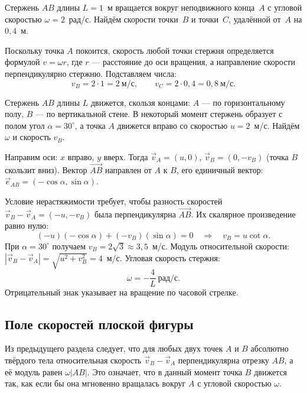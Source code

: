 \documentclass[../main.tex]{subfiles}
\begin{document}
\begin{example}
Стержень $AB$ длины $L = 1$~м вращается вокруг неподвижного конца~$A$
с угловой скоростью $\omega = 2$~рад/с. Найдём скорости точки~$B$
и точки~$C$, удалённой от~$A$ на $0{,}4$~м.

Поскольку точка $A$ покоится, скорость любой точки стержня определяется
формулой $v = \omega r$, где $r$ --- расстояние до оси вращения,
а направление скорости перпендикулярно стержню. Подставляем числа:
\[
v_B = 2 \cdot 1 = 2~\text{м/с}, \qquad
v_C = 2 \cdot 0{,}4 = 0{,}8~\text{м/с}.
\]
\end{example}

\begin{example}
Стержень $AB$ длины $L$ движется, скользя концами: $A$ --- по горизонтальному
полу, $B$ --- по вертикальной стене. В некоторый момент стержень образует
с полом угол $\alpha = 30^\circ$, а точка $A$ движется вправо со скоростью
$u = 2$~м/с. Найдём $\omega$ и скорость $v_B$.

Направим оси: $x$ вправо, $y$ вверх. Тогда $\vec{v}_A = (u, 0)$,
$\vec{v}_B = (0, -v_B)$ (точка $B$ скользит вниз).
Вектор $\overrightarrow{AB}$ направлен от $A$ к $B$, его единичный вектор:
$\vec{e}_{AB} = (-\cos\alpha, \sin\alpha)$.

Условие нерастяжимости требует, чтобы разность скоростей
$\vec{v}_B - \vec{v}_A = (-u, -v_B)$ была перпендикулярна $\overrightarrow{AB}$.
Их скалярное произведение равно нулю:
\[
(-u)(-\cos\alpha) + (-v_B)(\sin\alpha) = 0
\quad\Longrightarrow\quad
v_B = u \cot\alpha.
\]
При $\alpha = 30^\circ$ получаем $v_B = 2\sqrt{3} \approx 3{,}5$~м/с.
Модуль относительной скорости:
$|\vec{v}_B - \vec{v}_A| = \sqrt{u^2 + v_B^2} = 4$~м/с.
Угловая скорость стержня:
\[
\omega = -\frac{4}{L}~\text{рад/с}.
\]
Отрицательный знак указывает на вращение по часовой стрелке.
\end{example}

\subsection{Поле скоростей плоской фигуры}

Из предыдущего раздела следует, что для любых двух точек $A$ и $B$ абсолютно твёрдого тела
относительная скорость $\vec{v}_B - \vec{v}_A$ перпендикулярна отрезку $AB$,
а её модуль равен $\omega |AB|$. Это означает, что в данный момент точка $B$
движется так, как если бы она мгновенно вращалась вокруг $A$ с угловой скоростью $\omega$.
\end{document}
